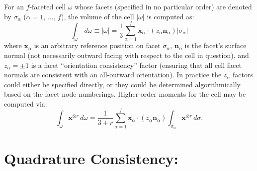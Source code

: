 \documentclass[11pt]{article} %
\begin{document}
For an $f$-faceted cell $\omega$ whose facets (specified in no particular order) are denoted by $\sigma_\alpha$ ($\alpha = 1, \, \ldots, \, f$), the volume of the cell $|\omega|$ is computed as:
\begin{equation}
	\int_{\omega} \, d \omega \equiv | \omega | = \frac{1}{3} \sum_{\alpha=1}^f \mathbf{x}_{\alpha} \cdot (z_\alpha \mathbf{n}_{\alpha}) | \sigma_{\alpha} |
\end{equation}
where $\mathbf{x}_\alpha$ is an arbitrary reference position on facet $\sigma_\alpha$, $\mathbf{n}_\alpha$ is the facet's surface normal (not necessarily outward facing with respect to the cell in question), and $z_\alpha = \pm 1$ is a facet ``orientation consistency'' factor (ensuring that all cell facet normals are consistent with an all-outward orientation). In practice the $z_\alpha$ factors could either be specified directly, or they could be determined algorithmically based on the facet node numberings. Higher-order moments for the cell may be computed via:
\begin{equation}
	\int_{\omega} \mathbf{x}^{\otimes r} \, d \omega = \frac{1}{3+r} \sum_{\alpha=1}^f \mathbf{x}_{\alpha} \cdot (z_\alpha \mathbf{n}_{\alpha}) \int_{\sigma_{\alpha}} \mathbf{x}^{\otimes r} \, d \sigma .
\end{equation}

\newpage

\section{Quadrature Consistency:}
\end{document}
